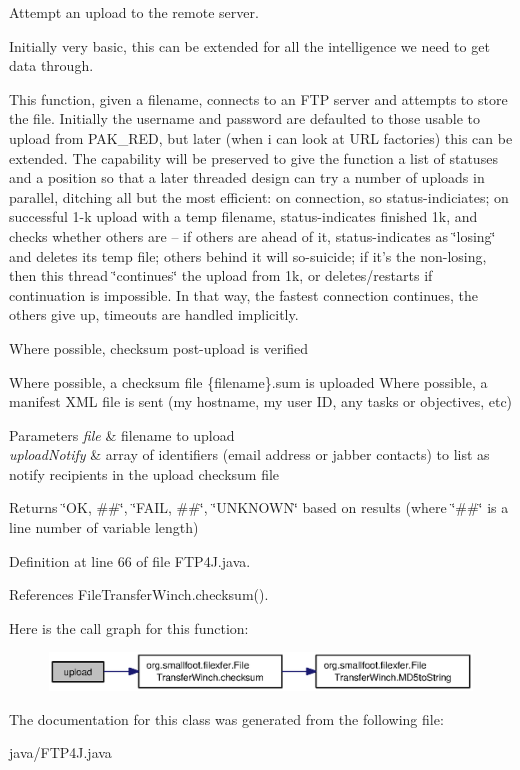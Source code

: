 Attempt an upload to the remote server. 

Initially very basic, this can be extended for all the intelligence we need to get data through.

This function, given a filename, connects to an F\+T\+P server and attempts to store the file. Initially the username and password are defaulted to those usable to upload from P\+A\+K\+\_\+\+R\+E\+D, but later (when i can look at U\+R\+L factories) this can be extended. The capability will be preserved to give the function a list of statuses and a position so that a later threaded design can try a number of uploads in parallel, ditching all but the most efficient\+: on connection, so status-\/indiciates; on successful 1-\/k upload with a temp filename, status-\/indicates finished 1k, and checks whether others are -- if others are ahead of it, status-\/indicates as \char`\"{}losing\char`\"{} and deletes its temp file; others behind it will so-\/suicide; if it's the non-\/losing, then this thread \char`\"{}continues\char`\"{} the upload from 1k, or deletes/restarts if continuation is impossible. In that way, the fastest connection continues, the others give up, timeouts are handled implicitly.

Where possible, checksum post-\/upload is verified

Where possible, a checksum file \{filename\}.sum is uploaded Where possible, a manifest X\+M\+L file is sent (my hostname, my user I\+D, any tasks or objectives, etc)


\begin{DoxyParams}{Parameters}
{\em file} & filename to upload \\
\hline
{\em upload\+Notify} & array of identifiers (email address or jabber contacts) to list as notify recipients in the upload checksum file \\
\hline
\end{DoxyParams}
\begin{DoxyReturn}{Returns}
\char`\"{}\+O\+K, \#\#\char`\"{}, \char`\"{}\+F\+A\+I\+L, \#\#\char`\"{}, \char`\"{}\+U\+N\+K\+N\+O\+W\+N\char`\"{} based on results (where \char`\"{}\#\#\char`\"{} is a line number of variable length) 
\end{DoxyReturn}


Definition at line 66 of file F\+T\+P4\+J.\+java.



References File\+Transfer\+Winch.\+checksum().



Here is the call graph for this function\+:\nopagebreak
\begin{figure}[H]
\begin{center}
\leavevmode
\includegraphics[width=350pt]{classorg_1_1smallfoot_1_1filexfer_1_1FTP4J_afa3dfccec4b989cafc56103eb1ee82a6_cgraph}
\end{center}
\end{figure}




The documentation for this class was generated from the following file\+:\begin{DoxyCompactItemize}
\item 
java/F\+T\+P4\+J.\+java\end{DoxyCompactItemize}
